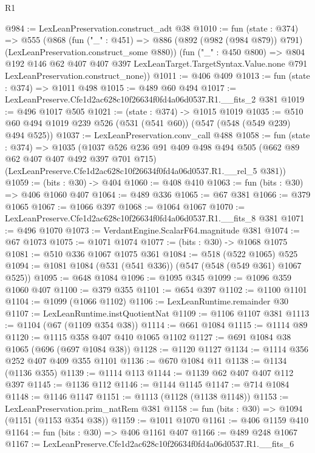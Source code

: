 \begin{lexlean}{R1}
\begin{coremodule}
@984 := LexLeanPreservation.construct_adt @38
@1010 := fun (state : @374) =>
  @555
    (@868
      (fun ("_" : @451) =>
      @886 (@892 (@982 (@984 @879)) @791) (LexLeanPreservation.construct_some @880))
      (fun ("_" : @450 @800) =>
      @804
        @192
        @146
        @62
        @407
        @407
        @397
        LexLeanTarget.TargetSyntax.Value.none
        @791
        LexLeanPreservation.construct_none))
@1011 := @406 @409
@1013 := fun (state : @374) => @1011 @498
@1015 := @489 @60 @494
@1017 := LexLeanPreserve.Cfe1d2ac628c10f26634f0fd4a06d0537.R1.__fits_2 @381
@1019 := @496 @1017 @505
@1021 := (state : @374) -> @1015 @1019
@1035 := @510 @60 @494 @1019 @239 @526 (@531 (@541 @60)) (@547 (@548 (@549 @239) @494 @525))
@1037 := LexLeanPreservation.conv_call @488
@1058 := fun (state : @374) =>
  @1035
    (@1037
      @526
      @236
      @91
      @409
      @498
      @494
      @505
      (@662 @89 @62 @407 @407 @492 @397 @701 @715)
      (LexLeanPreserve.Cfe1d2ac628c10f26634f0fd4a06d0537.R1.__rel_5 @381))
@1059 := (bits : @30) -> @404
@1060 := @408 @410
@1063 := fun (bits : @30) => @406 @1060 @407
@1064 := @489 @336
@1065 := @67 @381
@1066 := @379 @1065
@1067 := @1066 @397
@1068 := @1064 @1067
@1070 := LexLeanPreserve.Cfe1d2ac628c10f26634f0fd4a06d0537.R1.__fits_8 @381
@1071 := @496 @1070
@1073 := VerdantEngine.ScalarF64.magnitude @381
@1074 := @67 @1073
@1075 := @1071 @1074
@1077 := (bits : @30) -> @1068 @1075
@1081 := @510 @336 @1067 @1075 @361
@1084 := @518 (@522 @1065) @525
@1094 := @1081 @1084 (@531 (@541 @336)) (@547 (@548 (@549 @361) @1067 @525))
@1095 := @648 @1084
@1096 := @1095 @345
@1099 := @1096 @359 @1060 @407
@1100 := @379 @355
@1101 := @654 @397
@1102 := @1100 @1101
@1104 := @1099 (@1066 @1102)
@1106 := LexLeanRuntime.remainder @30
@1107 := LexLeanRuntime.instQuotientNat
@1109 := @1106 @1107 @381
@1113 := @1104 (@67 (@1109 @354 @38))
@1114 := @661 @1084
@1115 := @1114 @89
@1120 := @1115 @358 @407 @410 @1065 @1102
@1127 := @691 @1084 @38 @1065 (@696 (@697 @1084 @38))
@1128 := @1120 @1127
@1134 := @1114 @356 @252 @407 @409 @355 @1101
@1136 := @670 @1084 @11
@1138 := @1134 (@1136 @355)
@1139 := @1114 @113
@1144 := @1139 @62 @407 @407 @112 @397
@1145 := @1136 @112
@1146 := @1144 @1145
@1147 := @714 @1084
@1148 := @1146 @1147
@1151 := @1113 (@1128 (@1138 @1148))
@1153 := LexLeanPreservation.prim_natRem @381
@1158 := fun (bits : @30) => @1094 (@1151 (@1153 @354 @38))
@1159 := @1011 @1070
@1161 := @406 @1159 @410
@1164 := fun (bits : @30) => @406 @1161 @407
@1166 := @489 @248 @1067
@1167 := LexLeanPreserve.Cfe1d2ac628c10f26634f0fd4a06d0537.R1.__fits_6

\end{coremodule}
\end{lexlean}
